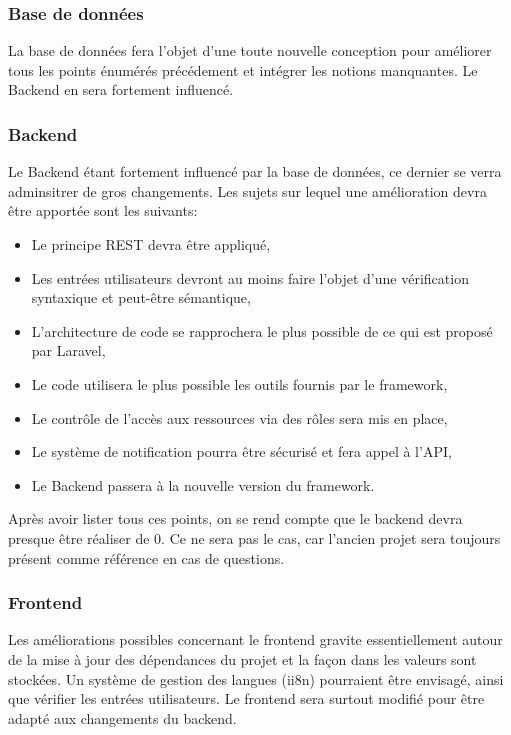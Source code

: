 \documentclass[
    iai, %
    il, %
]{heig-tb}
\begin{document}
\subsubsection{Base de données}
La base de données fera l'objet d'une toute nouvelle conception pour améliorer tous les points énumérés précédement et intégrer les notions manquantes. Le Backend en sera fortement influencé.

\subsubsection{Backend}
Le Backend étant fortement influencé par la base de données, ce dernier se verra adminsitrer de gros changements.\newline
Les sujets sur lequel une amélioration devra être apportée sont les suivants:
\begin{itemize}
    \item Le principe REST devra être appliqué,
    \item Les entrées utilisateurs devront au moins faire l'objet d'une vérification syntaxique et peut-être sémantique,
    \item L'architecture de code se rapprochera le plus possible de ce qui est proposé par Laravel,
    \item Le code utilisera le plus possible les outils fournis par le framework,
    \item Le contrôle de l'accès aux ressources via des rôles sera mis en place,
    \item Le système de notification pourra être sécurisé et fera appel à l'API,
    \item Le Backend passera à la nouvelle version du framework.
\end{itemize}

Après avoir lister tous ces points, on se rend compte que le backend devra presque être réaliser de 0. Ce ne sera pas le cas, car l'ancien projet sera toujours présent comme référence en cas de questions.

\subsubsection{Frontend}
Les améliorations possibles concernant le frontend gravite essentiellement autour de la mise à jour des dépendances du projet et la façon dans les valeurs sont stockées.\newline
Un système de gestion des langues (ii8n) pourraient être envisagé, ainsi que vérifier les entrées utilisateurs.\newline
Le frontend sera surtout modifié pour être adapté aux changements du backend.
\end{document}
